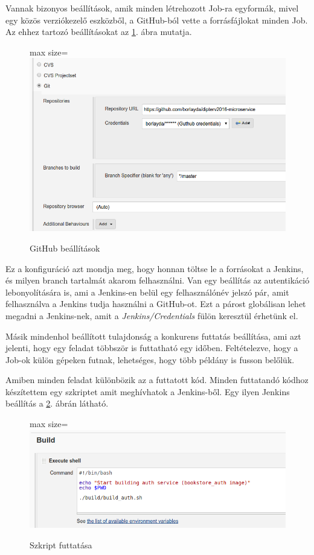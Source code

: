 \documentclass[11pt,magyar,a4paper,twoside,]{report}
\let\Oldincludegraphics\includegraphics
\renewcommand{\includegraphics}[1]{
\begin{adjustbox}{max size={\textwidth}{\textheight}}
    \Oldincludegraphics[scale=0.6]{#1}%
\end{adjustbox}
}
\begin{document}
Vannak bizonyos beállítások, amik minden létrehozott Job-ra egyformák,
mivel egy közös verziókezelő eszközből, a GitHub-ból vette a
forrásfájlokat minden Job. Az ehhez tartozó beállításokat az
\ref{github-conf}. ábra mutatja.

\begin{figure}[H]
\centering
\includegraphics{img/github-config.png}
\caption{GitHub beállítások\label{github-conf}}
\end{figure}

Ez a konfiguráció azt mondja meg, hogy honnan töltse le a forrásokat a
Jenkins, és milyen branch tartalmát akarom felhasználni. Van egy
beállítás az autentikáció lebonyolítására is, ami a Jenkins-en belül egy
felhasználónév jelszó pár, amit felhasználva a Jenkins tudja használni a
GitHub-ot. Ezt a párost globálisan lehet megadni a Jenkins-nek, amit a
\emph{Jenkins/Credentials} fülön keresztül érhetünk el.

Másik mindenhol beállított tulajdonság a konkurens futtatás beállítása,
ami azt jelenti, hogy egy feladat többször is futtatható egy időben.
Feltételezve, hogy a Job-ok külön gépeken futnak, lehetséges, hogy több
példány is fusson belőlük.

Amiben minden feladat különbözik az a futtatott kód. Minden futtatandó
kódhoz készítettem egy szkriptet amit meghívhatok a Jenkins-ből. Egy
ilyen Jenkins beállítás a \ref{script-run}. ábrán látható.

\begin{figure}[H]
\centering
\includegraphics{img/script-run.png}
\caption{Szkript futtatása\label{script-run}}
\end{figure}
\end{document}
